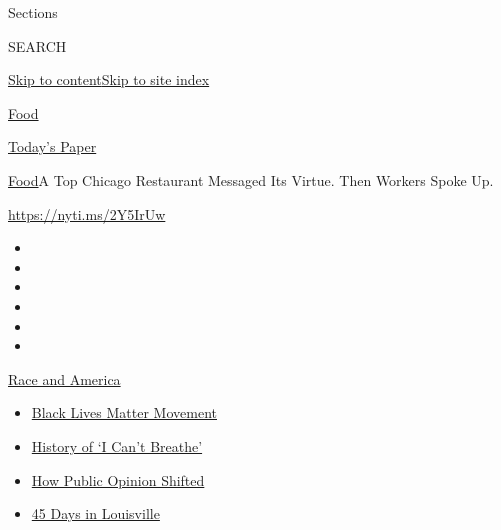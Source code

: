 Sections

SEARCH

\protect\hyperlink{site-content}{Skip to
content}\protect\hyperlink{site-index}{Skip to site index}

\href{https://www.nytimes3xbfgragh.onion/section/food}{Food}

\href{https://myaccount.nytimes3xbfgragh.onion/auth/login?response_type=cookie\&client_id=vi}{}

\href{https://www.nytimes3xbfgragh.onion/section/todayspaper}{Today's
Paper}

\href{/section/food}{Food}\textbar{}A Top Chicago Restaurant Messaged
Its Virtue. Then Workers Spoke Up.

\url{https://nyti.ms/2Y5IrUw}

\begin{itemize}
\item
\item
\item
\item
\item
\item
\end{itemize}

\href{https://www.nytimes3xbfgragh.onion/news-event/george-floyd-protests-minneapolis-new-york-los-angeles?action=click\&pgtype=Article\&state=default\&region=TOP_BANNER\&context=storylines_menu}{Race
and America}

\begin{itemize}
\tightlist
\item
  \href{https://www.nytimes3xbfgragh.onion/interactive/2020/07/03/us/george-floyd-protests-crowd-size.html?action=click\&pgtype=Article\&state=default\&region=TOP_BANNER\&context=storylines_menu}{Black
  Lives Matter Movement}
\item
  \href{https://www.nytimes3xbfgragh.onion/interactive/2020/06/28/us/i-cant-breathe-police-arrest.html?action=click\&pgtype=Article\&state=default\&region=TOP_BANNER\&context=storylines_menu}{History
  of `I Can't Breathe'}
\item
  \href{https://www.nytimes3xbfgragh.onion/interactive/2020/06/10/upshot/black-lives-matter-attitudes.html?action=click\&pgtype=Article\&state=default\&region=TOP_BANNER\&context=storylines_menu}{How
  Public Opinion Shifted}
\item
  \href{https://www.nytimes3xbfgragh.onion/interactive/2020/07/16/us/black-lives-matter-protests-louisville-breonna-taylor.html?action=click\&pgtype=Article\&state=default\&region=TOP_BANNER\&context=storylines_menu}{45
  Days in Louisville}
\end{itemize}

